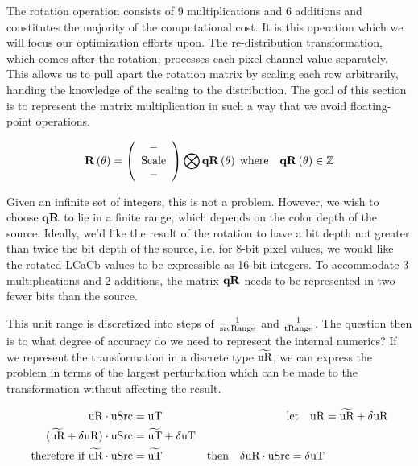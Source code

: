The rotation operation consists of 9 multiplications and 6 additions and constitutes the majority of the computational cost. It is this operation which we will focus our optimization efforts upon. The re-distribution transformation, which comes after the rotation, processes each pixel channel value separately. This allows us to pull apart the rotation matrix by scaling each row arbitrarily, handing the knowledge of the scaling to the distribution. The goal of this section is to represent the matrix multiplication in such a way that we avoid floating-point operations.

\begin{equation}\label{eq:NormRxyz4}
 \R[\theta] =
\left(
\begin{array}{c}
 -  \\
 \text{Scale} \\
 -  \\
\end{array}
\right)
\bigotimes
\qR[\theta]\;\text{where}\quad{\qR[\theta]\in\mathbb{Z}}
\end{equation}

Given an infinite set of integers, this is not a problem. However, we wish to choose $\qR$ to lie in a finite range, which depends on the color depth of the source. Ideally, we'd like the result of the rotation to have a bit depth not greater than twice the bit depth of the source, i.e. for 8-bit pixel values, we would like the rotated LCaCb values to be expressible as 16-bit integers. To accommodate 3 multiplications and 2 additions, the matrix $\qR$ needs to be represented in two fewer bits than the source.

This unit range is discretized into steps of $\frac{1}{\text{srcRange}}$ and $\frac{1}{\text{tRange}}$. The question then is to what degree of accuracy do we need to represent the internal numerics? If we represent the transformation in a discrete type $\widetilde{\text{uR}}$, we can express the problem in terms of the largest perturbation which can be made to the transformation without affecting the result.


\begin{equation}\label{eq:lxyPixel}
\begin{aligned}
\text{uR}  \cdot \text{uSrc} &= \text{uT}  &\text{let} \quad \text{uR} &= \widetilde{\text{uR}} + \delta\text{uR} \\
(\widetilde{\text{uR}} + \delta\text{uR})  \cdot \text{uSrc} &= \widetilde{\text{uT}} + \delta\text{uT} \\
\text{therefore if } \widetilde{\text{uR}} \cdot \text{uSrc} &= \widetilde{\text{uT}} & \text{then}\quad \delta\text{uR}  \cdot \text{uSrc} = \delta\text{uT}
\end{aligned} 
\end{equation}

